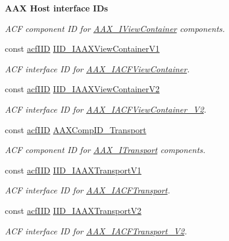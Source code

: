 \begin{Indent}{\bf A\+A\+X Host interface I\+Ds}
\begin{DoxyCompactItemize}
\begin{DoxyCompactList}\small\item\em A\+C\+F component I\+D for \hyperlink{a00117}{A\+A\+X\+\_\+\+I\+View\+Container} components. \end{DoxyCompactList}\item 
const \hyperlink{a00150_a59df0b41744eee7a066787aaedf97f67}{acf\+I\+I\+D} \hyperlink{a00299_a854aa90e4fa7f91dae9282fe008d4005}{I\+I\+D\+\_\+\+I\+A\+A\+X\+View\+Container\+V1}
\begin{DoxyCompactList}\small\item\em A\+C\+F interface I\+D for \hyperlink{a00084}{A\+A\+X\+\_\+\+I\+A\+C\+F\+View\+Container}. \end{DoxyCompactList}\item 
const \hyperlink{a00150_a59df0b41744eee7a066787aaedf97f67}{acf\+I\+I\+D} \hyperlink{a00299_ade506fadfb23a9f4deb4be228b1f6fa8}{I\+I\+D\+\_\+\+I\+A\+A\+X\+View\+Container\+V2}
\begin{DoxyCompactList}\small\item\em A\+C\+F interface I\+D for \hyperlink{a00085}{A\+A\+X\+\_\+\+I\+A\+C\+F\+View\+Container\+\_\+\+V2}. \end{DoxyCompactList}\item 
const \hyperlink{a00150_a59df0b41744eee7a066787aaedf97f67}{acf\+I\+I\+D} \hyperlink{a00299_aa407c13a2ddcc4c1078acb837c76003e}{A\+A\+X\+Comp\+I\+D\+\_\+\+Transport}
\begin{DoxyCompactList}\small\item\em A\+C\+F component I\+D for \hyperlink{a00116}{A\+A\+X\+\_\+\+I\+Transport} components. \end{DoxyCompactList}\item 
const \hyperlink{a00150_a59df0b41744eee7a066787aaedf97f67}{acf\+I\+I\+D} \hyperlink{a00299_af0982d7ceed67bd8b50476193cdbc7c3}{I\+I\+D\+\_\+\+I\+A\+A\+X\+Transport\+V1}
\begin{DoxyCompactList}\small\item\em A\+C\+F interface I\+D for \hyperlink{a00082}{A\+A\+X\+\_\+\+I\+A\+C\+F\+Transport}. \end{DoxyCompactList}\item 
const \hyperlink{a00150_a59df0b41744eee7a066787aaedf97f67}{acf\+I\+I\+D} \hyperlink{a00299_a766ade9b30cfff0223a033630ddfda3c}{I\+I\+D\+\_\+\+I\+A\+A\+X\+Transport\+V2}
\begin{DoxyCompactList}\small\item\em A\+C\+F interface I\+D for \hyperlink{a00083}{A\+A\+X\+\_\+\+I\+A\+C\+F\+Transport\+\_\+\+V2}. \end{DoxyCompactList}\item 

\end{DoxyCompactItemize}
\end{Indent}
